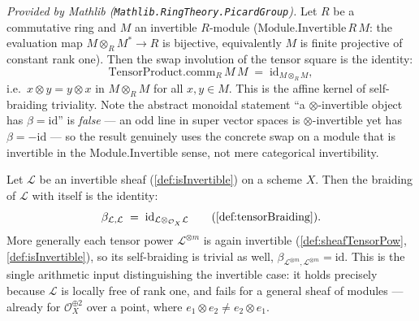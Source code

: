\begin{lemma}
  \label{lem:tensorProductComm_eq_refl_mathlib}
  \mathlibok
  \textit{Provided by Mathlib (\texttt{Mathlib.RingTheory.PicardGroup}).}
  Let \(R\) be a commutative ring and \(M\) an invertible \(R\)-module
  (\(\mathrm{Module.Invertible}\,R\,M\): the evaluation map
  \(M \otimes_R M^{\ast} \to R\) is bijective, equivalently \(M\) is finite
  projective of constant rank one). Then the swap involution of the tensor square
  is the identity:
  \[
    \mathrm{TensorProduct.comm}_R\,M\,M \;=\;
      \mathrm{id}_{M \otimes_R M},
  \]
  i.e.\ \(x \otimes y = y \otimes x\) in \(M \otimes_R M\) for all
  \(x, y \in M\). This is the affine kernel of self-braiding triviality. Note the
  abstract monoidal statement ``a \(\otimes\)-invertible object has
  \(\beta = \mathrm{id}\)'' is \emph{false} --- an odd line in super vector spaces
  is \(\otimes\)-invertible yet has \(\beta = -\mathrm{id}\) --- so the result
  genuinely uses the concrete swap on a module that is invertible in the
  \(\mathrm{Module.Invertible}\) sense, not mere categorical invertibility.
\end{lemma}

\begin{lemma}

  \label{lem:braiding_eq_id_of_invertible}
  Let \(\mathcal{L}\) be an invertible sheaf (\cref{def:isInvertible}) on a scheme
  \(X\). Then the braiding of \(\mathcal{L}\) with itself is the identity:
  \[
    \beta_{\mathcal{L},\mathcal{L}} \;=\;
      \mathrm{id}_{\mathcal{L} \otimes_{\mathcal{O}_X} \mathcal{L}}
    \qquad(\cref{def:tensorBraiding}).
  \]
  More generally each tensor power \(\mathcal{L}^{\otimes m}\) is again invertible
  (\cref{def:sheafTensorPow}, \cref{def:isInvertible}), so its self-braiding is
  trivial as well, \(\beta_{\mathcal{L}^{\otimes m},\mathcal{L}^{\otimes m}} =
  \mathrm{id}\). This is the single arithmetic input distinguishing the invertible
  case: it holds precisely because \(\mathcal{L}\) is locally free of rank one, and
  fails for a general sheaf of modules --- already for
  \(\mathcal{O}_X^{\oplus 2}\) over a point, where
  \(e_1 \otimes e_2 \neq e_2 \otimes e_1\).
\end{lemma}

